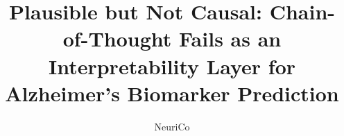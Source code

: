 \documentclass{article}
\title{Plausible but Not Causal: Chain-of-Thought Fails as an\\Interpretability Layer for Alzheimer's Biomarker Prediction}
\author{NeuriCo}
\begin{document}
\maketitle

\begin{abstract}

\end{abstract}










\appendix

\end{document}
